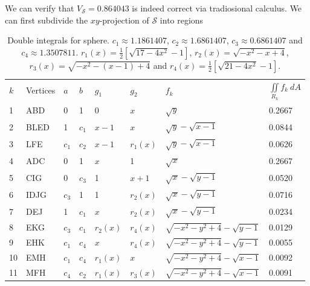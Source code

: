 \documentclass{article}
\theoremstyle{theorem}
\theoremstyle{definition}
\begin{document}
We can verify that $V_{\mathcal{S}}=0.864043$ is indeed correct via tradiosional calculus. We can first subdivide the $xy$-projection of $\mathcal{S}$ into regions 

\begin{table}
\caption{Double integrals for sphere. $c_1 \approx 1.1861407$, $c_2 \approx 1.6861407$, $c_3 \approx 0.6861407$ and $c_4 \approx 1.3507811$. $r_1(x) = \frac{1}{2}[\sqrt{17-4x^2}-1]$,
$r_2(x) = \sqrt{-x^2-x+4}$, $r_3(x) = \sqrt{-x^2-(x-1)+4}$ and $r_4(x) = \frac{1}{2}[\sqrt{21-4x^2}-1]$.} 
\begin{center}

\begin{tabular}{|l l l l l l l l|}
  $k$ & Vertices & $a$ & $b$  & $g_1$ & $g_2$ & $f_k$ & $\iint\limits_{\!R_k} f_k~dA$\\
  1 & ABD & 0 & 1& 0 & $x$ & $\sqrt{y}$ & 0.2667\\
  2 & BLED& 1& $c_1$ & $x-1$ & $x$ & $\sqrt{y} - \sqrt{x-1}$& 0.0844\\
  3 & LFE& $c_1$ & $c_2$ & $x-1$ & $r_1(x)$&$\sqrt{y} - \sqrt{x-1}$&0.0626\\
  4 & ADC& 0 & 1 & $x$ & 1 & $\sqrt{x}$ &0.2667\\
  5 & CIG& 0 & $c_3$ & 1 & $x+1$ & $\sqrt{x} - \sqrt{y-1}$ &0.0520\\
  6 & IDJG& $c_3$ & 1 & 1 & $r_2(x)$ & $\sqrt{x} - \sqrt{y-1}$&0.0716\\
  7 & DEJ& 1& $c_1$& $x$ & $r_2(x)$ & $\sqrt{x} - \sqrt{y-1}$&0.0234\\ 
  8 & EKG& $c_3$& $c_1$& $r_2(x)$ & $r_4(x)$ & $\sqrt{-x^2-y^2+4}-\sqrt{y-1}$&0.0129\\ 
  9 & EHK& $c_1$& $c_4$& $x$& $r_4(x)$ & $\sqrt{-x^2-y^2+4}-\sqrt{y-1}$&0.0055\\
  10& EMH& $c_1$& $c_4$& $r_1(x)$& $x$ & $\sqrt{-x^2-y^2+4}-\sqrt{x-1}$&0.0092\\
  11& MFH& $c_4$& $c_2$& $r_1(x)$& $r_3(x)$ & $\sqrt{-x^2-y^2+4}-\sqrt{x-1}$&0.0091\\ 

\end{tabular}
\end{center}
\end{table}
\end{document}
